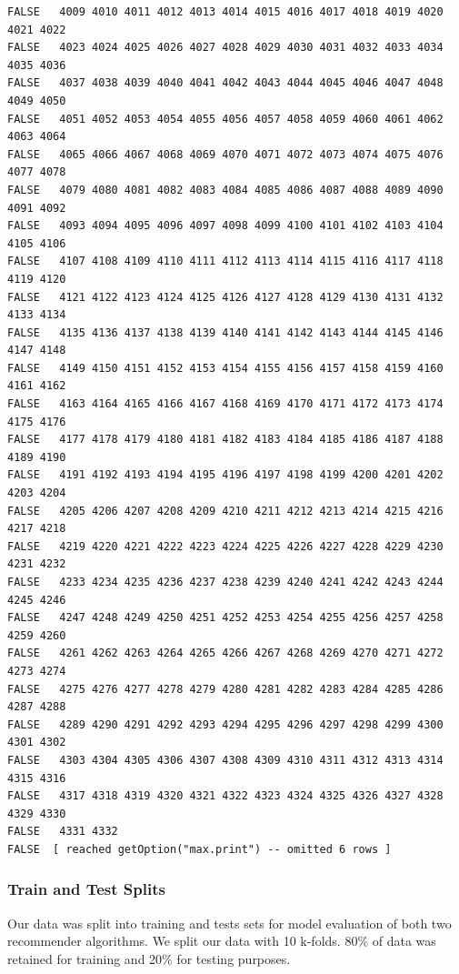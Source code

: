 \documentclass[]{article}
\begin{document}
\begin{verbatim}
FALSE   4009 4010 4011 4012 4013 4014 4015 4016 4017 4018 4019 4020 4021 4022
FALSE   4023 4024 4025 4026 4027 4028 4029 4030 4031 4032 4033 4034 4035 4036
FALSE   4037 4038 4039 4040 4041 4042 4043 4044 4045 4046 4047 4048 4049 4050
FALSE   4051 4052 4053 4054 4055 4056 4057 4058 4059 4060 4061 4062 4063 4064
FALSE   4065 4066 4067 4068 4069 4070 4071 4072 4073 4074 4075 4076 4077 4078
FALSE   4079 4080 4081 4082 4083 4084 4085 4086 4087 4088 4089 4090 4091 4092
FALSE   4093 4094 4095 4096 4097 4098 4099 4100 4101 4102 4103 4104 4105 4106
FALSE   4107 4108 4109 4110 4111 4112 4113 4114 4115 4116 4117 4118 4119 4120
FALSE   4121 4122 4123 4124 4125 4126 4127 4128 4129 4130 4131 4132 4133 4134
FALSE   4135 4136 4137 4138 4139 4140 4141 4142 4143 4144 4145 4146 4147 4148
FALSE   4149 4150 4151 4152 4153 4154 4155 4156 4157 4158 4159 4160 4161 4162
FALSE   4163 4164 4165 4166 4167 4168 4169 4170 4171 4172 4173 4174 4175 4176
FALSE   4177 4178 4179 4180 4181 4182 4183 4184 4185 4186 4187 4188 4189 4190
FALSE   4191 4192 4193 4194 4195 4196 4197 4198 4199 4200 4201 4202 4203 4204
FALSE   4205 4206 4207 4208 4209 4210 4211 4212 4213 4214 4215 4216 4217 4218
FALSE   4219 4220 4221 4222 4223 4224 4225 4226 4227 4228 4229 4230 4231 4232
FALSE   4233 4234 4235 4236 4237 4238 4239 4240 4241 4242 4243 4244 4245 4246
FALSE   4247 4248 4249 4250 4251 4252 4253 4254 4255 4256 4257 4258 4259 4260
FALSE   4261 4262 4263 4264 4265 4266 4267 4268 4269 4270 4271 4272 4273 4274
FALSE   4275 4276 4277 4278 4279 4280 4281 4282 4283 4284 4285 4286 4287 4288
FALSE   4289 4290 4291 4292 4293 4294 4295 4296 4297 4298 4299 4300 4301 4302
FALSE   4303 4304 4305 4306 4307 4308 4309 4310 4311 4312 4313 4314 4315 4316
FALSE   4317 4318 4319 4320 4321 4322 4323 4324 4325 4326 4327 4328 4329 4330
FALSE   4331 4332
FALSE  [ reached getOption("max.print") -- omitted 6 rows ]
\end{verbatim}

\hypertarget{train-and-test-splits}{%
\subsubsection{Train and Test Splits}\label{train-and-test-splits}}

Our data was split into training and tests sets for model evaluation of
both two recommender algorithms. We split our data with 10 k-folds. 80\%
of data was retained for training and 20\% for testing purposes.
\end{document}
